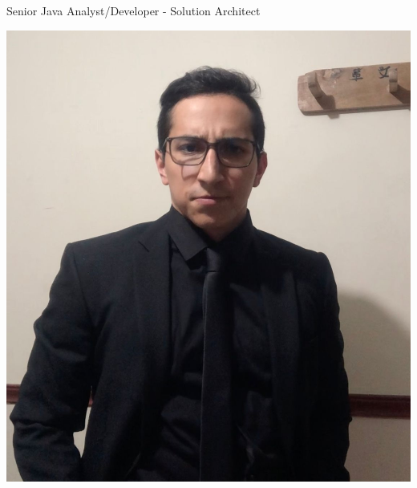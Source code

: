 \documentclass[american]{cv-class}
\begin{document}
{Senior Java Analyst/Developer - Solution Architect }

\vspace{1.15cm}

\begin{aside}
	\includegraphics[scale=0.10]{img/indice.jpeg}
	~
	\vspace{0.35cm}

\end{aside}
\end{document}
